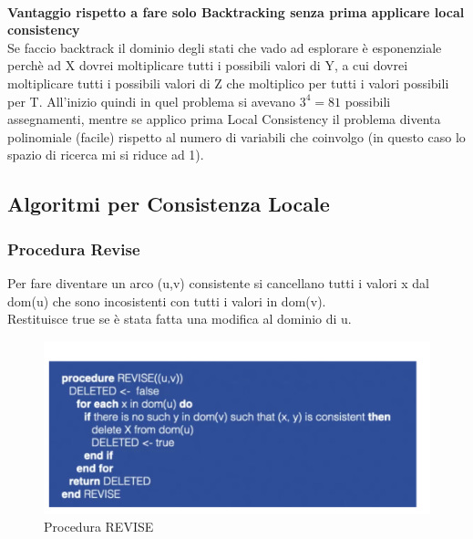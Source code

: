 \vspace{0.3cm}
\\\textbf{Vantaggio rispetto a fare solo Backtracking senza prima applicare local consistency}
\\Se faccio backtrack il dominio degli stati che vado ad esplorare è esponenziale perchè ad X dovrei moltiplicare tutti i possibili valori di Y, a cui dovrei moltiplicare tutti i possibili valori di Z che moltiplico per tutti i valori possibili per T. All’inizio quindi in quel problema si avevano $3^4 = 81$ possibili assegnamenti, mentre se applico prima Local Consistency il problema diventa polinomiale (facile) rispetto al numero di variabili che coinvolgo (in questo caso lo spazio di ricerca mi si riduce ad 1).
\subsection{Algoritmi per Consistenza Locale}
\subsubsection{Procedura Revise}
Per fare diventare un arco (u,v) consistente si cancellano tutti i valori x dal dom(u) che sono incosistenti con tutti i valori in dom(v).
\\Restituisce true se è stata fatta una modifica al dominio di u.
\begin{figure}[htp]
	\centering
    \includegraphics[width=13cm, keepaspectratio]{img/Cap3/revise.png}
    \caption{Procedura REVISE}
\end{figure}
\newpage

